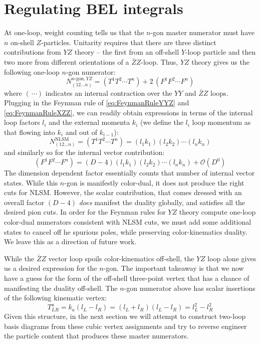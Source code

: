 \documentclass[11pt,letter]{article}
\begin{document}
\section{Regulating BEL integrals}\label{BELreg}
At one-loop, weight counting tells us that the $n$-gon master numerator must have $n$ on-shell $Z$-particles. Unitarity requires that there are three distinct contributions from $Y\!Z$ theory -- the first from an off-shell $Y$-loop particle and then two more from different orientations of a $\bar{Z}Z$-loop.  Thus, $Y\!Z$ theory gives us the following one-loop $n$-gon numerator:
\begin{equation}
N^{n\text{-gon},YZ}_{(12...n)} = (T^{1}T^{2}\cdots T^{n})+2\, (F^1F^2\cdots F^n)
\end{equation}
where $(\,\cdots)$ indicates an internal contraction over the $YY$ and $\bar{Z}Z$ loops. Plugging in the Feynman rule of \cref{eq:FeynmanRuleYYZ} and \cref{eq:FeynmanRuleXZZ}, we can readily obtain expressions in terms of the internal loop factors $l_i$ and the external momenta $k_i$ (we define the $l_i$ loop momentum as that flowing into $k_i$ and out of $k_{i-1}$):
\begin{equation}
N_{(12...n)}^{\text{NLSM}}=(T^{1}T^{2}\cdots T^{n}) = (l_1 k_1)(l_2 k_2) \cdots (l_n k_n)
\end{equation}
and similarly so for the internal vector contribution:
\begin{equation}
 (F^1F^2\cdots F^n) = (D-4)(l_1 k_1)(l_2 k_2) \cdots (l_n k_n) + \mathcal{O}(D^0)
\end{equation}
The dimension dependent factor essentially counts that number of internal vector states. While this $n$-gon is manifestly color-dual, it does not produce the right cuts for NLSM. However, the scalar contribution, that comes dressed with an overall factor $(D-4)$ \textit{does} manifest the duality globally, and satisfies all the desired pion cuts. In order for the Feynman rules for $Y\!Z$ theory compute one-loop color-dual numerators consistent with NLSM cuts, we must add some additional states to cancel off he spurious poles, while preserving color-kinematics duality. We leave this as a direction of future work. 

While the $\bar{Z}Z$ vector loop spoils color-kinematics off-shell, the $Y\!Z$ loop alone gives us a desired expression for the $n$-gon. The important takeaway is that we now have a guess for the form of the off-shell three-point vertex that has a chance of manifesting the duality off-shell. The $n$-gon numerator above has scalar insertions of the following kinematic vertex:
\begin{equation}
T^{a}_{LR} = k_a(l_L-l_{R}) = (l_L+l_{R}) (l_L-l_{R})  = l_L^2-l_{R}^2 
\end{equation}
Given this structure, in the next section we will attempt to construct two-loop basis diagrams from these cubic vertex assignments and try to reverse engineer the particle content that produces these master numerators.
\end{document}
